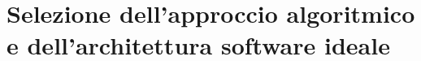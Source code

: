 \section{Selezione dell'approccio algoritmico e dell'architettura software ideale}
\label{sec:selezione_approccio}
